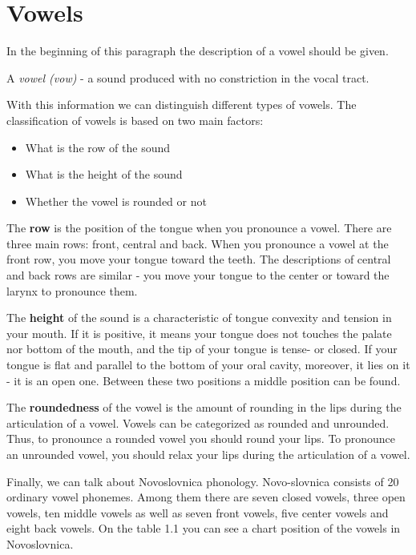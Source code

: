 \section{Vowels}

In the beginning of this paragraph the description of a vowel should be given.


A \textit{vowel (\gls{vow})} - a sound produced with no constriction in the vocal tract.

With this information we can distinguish different types of vowels. The classification of vowels is based on two main factors:

\begin{itemize}
	\item{What is the row of the sound}
	\item{What is the height of the sound}
	\item{Whether the vowel is rounded or not}
\end{itemize}

The \textbf{row} is the position of the tongue when you pronounce a vowel. There are three main rows: front, central and back. When you pronounce a vowel at the front row, you move your tongue toward the teeth. The descriptions of central and back rows are similar - you move your tongue to the center or toward the larynx to pronounce them.

The \textbf{height} of the sound is a characteristic of tongue convexity and tension in your mouth. If it is positive, it means your tongue does not touches the palate nor bottom of the mouth, and the tip of your tongue is tense- or closed. If your tongue is flat and parallel to the bottom of your oral cavity, moreover, it lies on it - it is an open one. Between these two positions a middle position can be found.

The \textbf{roundedness} of the vowel is the amount of rounding in the lips during the articulation of a vowel. Vowels can be categorized as rounded and unrounded. Thus, to pronounce a rounded vowel you should round your lips. To pronounce an unrounded vowel, you should relax your lips during the articulation of a vowel.

Finally, we can talk about Novoslovnica phonology. Novo-slovnica consists of 20 ordinary vowel phonemes. Among them there are seven closed vowels, three open vowels, ten middle vowels as well as seven front vowels, five center vowels and eight back vowels. On the table 1.1 you can see a chart position of the vowels in Novoslovnica.

